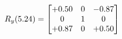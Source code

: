 \documentclass[preview]{standalone}
\begin{document}
\begin{align*}
\special{dvisvgm:raw <g id='unique000'>}R_{y}(5.24) = \begin{bmatrix}+0.50 & 0 & -0.87 \\0 & 1 & 0 \\+0.87 & 0 & +0.50\end{bmatrix}\special{dvisvgm:raw </g>}
\end{align*}
\end{document}
